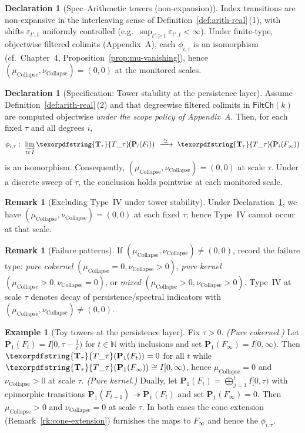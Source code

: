 \documentclass[11pt]{article}
\DeclareRobustCommand{\hyp}{\nobreakdash-}
\numberwithin{equation}{section}
\theoremstyle{definition}
\newtheorem{example}[theorem]{Example}
\newtheorem{remark}[theorem]{Remark}
\newtheorem{declaration}[theorem]{Declaration}
\DeclareRobustCommand{\FiltCh}[1]{\mathsf{FiltCh}(#1)}
\DeclareRobustCommand{\Ttau}{\texorpdfstring{\ensuremath{\mathbf{T}_{\tau}}}{T\_\tau}}
\DeclareRobustCommand{\muc}{\mu_{\mathrm{Collapse}}}
\DeclareRobustCommand{\nuc}{\nu_{\mathrm{Collapse}}}
\begin{document}
\begin{declaration}[Spec–Arithmetic towers (non\hyp expansion)]\label{spec:arith-nonexp}
Index transitions are non\hyp expansive in the interleaving sense of Definition~\ref{def:arith-real}\,(1), with shifts \(\varepsilon_{t',t}\) uniformly controlled (e.g.\ \(\sup_{t'\ge t}\varepsilon_{t',t}<\infty\)).
Under finite\hyp type, objectwise filtered colimits (Appendix~A), each \(\phi_{i,\tau}\) is an isomorphism (cf.\ Chapter~4, Proposition~\ref{prop:mu-vanishing}), hence \((\muc,\nuc)=(0,0)\) at the monitored scales.
\end{declaration}

\begin{declaration}[Specification: Tower stability at the persistence layer]\label{spec:tower-stability}
Assume Definition~\ref{def:arith-real}\,(2) and that degreewise filtered colimits in \(\FiltCh{k}\) are computed objectwise \emph{under the scope policy of Appendix~A}.
Then, for each fixed \(\tau\) and all degrees \(i\),
\[
  \phi_{i,\tau}:\ \varinjlim_{t\in I} \Ttau\!\big(\mathbf{P}_i(F_t)\big)\ \xrightarrow{\ \cong\ }\ \Ttau\!\big(\mathbf{P}_i(F_\infty)\big)
\]
is an isomorphism. Consequently, \((\muc,\nuc)=(0,0)\) at scale \(\tau\).
Under a discrete sweep of \(\tau\), the conclusion holds pointwise at each monitored scale.
\end{declaration}

\begin{remark}[Excluding Type~IV under tower stability]\label{rk:exclude-typeIV}
Under Declaration~\ref{spec:tower-stability}, we have \((\muc,\nuc)=(0,0)\) at each fixed \(\tau\); hence Type~IV cannot occur at that scale.
\end{remark}

\begin{remark}[Failure patterns]\label{rk:fail}
If \((\muc,\nuc)\neq(0,0)\), record the failure type: \emph{pure cokernel} \((\muc=0,\nuc>0)\), \emph{pure kernel} \((\muc>0,\nuc=0)\), or \emph{mixed} \((\muc>0,\nuc>0)\).
Type~IV at scale \(\tau\) denotes decay of persistence/spectral indicators with \((\muc,\nuc)\neq(0,0)\).
\end{remark}

\begin{example}[Toy towers at the persistence layer]\label{ex:toy-towers}
Fix \(\tau>0\).
\emph{(Pure cokernel.)} Let \(\mathbf{P}_1(F_t)=I[0,\tau-\tfrac{1}{t})\) for $t\in\mathbb{N}$ with inclusions and set \(\mathbf{P}_1(F_\infty)=I[0,\infty)\).
Then \(\Ttau(\mathbf{P}_1(F_t))=0\) for all $t$ while \(\Ttau(\mathbf{P}_1(F_\infty))\cong I[0,\infty)\), hence \(\muc=0\) and \(\nuc>0\) at scale \(\tau\).
\emph{(Pure kernel.)} Dually, let \(\mathbf{P}_1(F_t)=\bigoplus_{j=1}^{t} I[0,\tau)\) with epimorphic transitions \(\mathbf{P}_1(F_{t+1})\twoheadrightarrow \mathbf{P}_1(F_t)\) and set \(\mathbf{P}_1(F_\infty)=0\).
Then \(\muc>0\) and \(\nuc=0\) at scale \(\tau\).
In both cases the cone extension (Remark~\ref{rk:cone-extension}) furnishes the maps to \(F_\infty\) and hence the \(\phi_{i,\tau}\).
\end{example}
\end{document}
